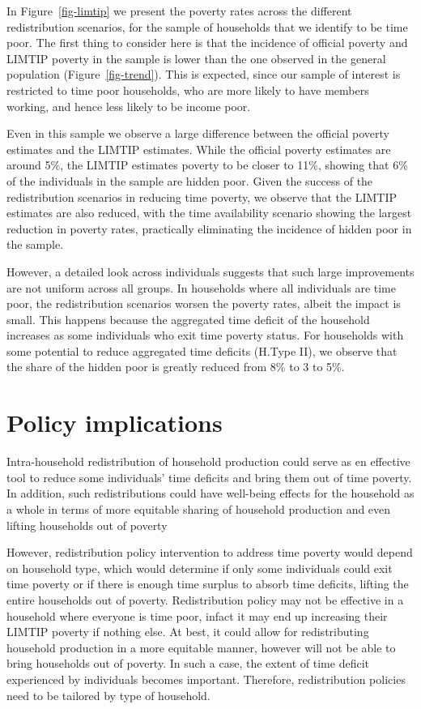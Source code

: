 \documentclass[
  11pt,
]{article}
\begin{document}
In Figure~\ref{fig-limtip} we present the poverty rates across the
different redistribution scenarios, for the sample of households that we
identify to be time poor. The first thing to consider here is that the
incidence of official poverty and LIMTIP poverty in the sample is lower
than the one observed in the general population
(Figure~\ref{fig-trend}). This is expected, since our sample of interest
is restricted to time poor households, who are more likely to have
members working, and hence less likely to be income poor.

Even in this sample we observe a large difference between the official
poverty estimates and the LIMTIP estimates. While the official poverty
estimates are around 5\%, the LIMTIP estimates poverty to be closer to
11\%, showing that 6\% of the individuals in the sample are hidden poor.
Given the success of the redistribution scenarios in reducing time
poverty, we observe that the LIMTIP estimates are also reduced, with the
time availability scenario showing the largest reduction in poverty
rates, practically eliminating the incidence of hidden poor in the
sample.

However, a detailed look across individuals suggests that such large
improvements are not uniform across all groups. In households where all
individuals are time poor, the redistribution scenarios worsen the
poverty rates, albeit the impact is small. This happens because the
aggregated time deficit of the household increases as some individuals
who exit time poverty status. For households with some potential to
reduce aggregated time deficits (H.Type II), we observe that the share
of the hidden poor is greatly reduced from 8\% to 3 to 5\%.

\section{Policy implications}\label{policy-implications}

Intra-household redistribution of household production could serve as en
effective tool to reduce some individuals' time deficits and bring them
out of time poverty. In addition, such redistributions could have
well-being effects for the household as a whole in terms of more
equitable sharing of household production and even lifting households
out of poverty

However, redistribution policy intervention to address time poverty
would depend on household type, which would determine if only some
individuals could exit time poverty or if there is enough time surplus
to absorb time deficits, lifting the entire households out of poverty.
Redistribution policy may not be effective in a household where everyone
is time poor, infact it may end up increasing their LIMTIP poverty if
nothing else. At best, it could allow for redistributing household
production in a more equitable manner, however will not be able to bring
households out of poverty. In such a case, the extent of time deficit
experienced by individuals becomes important. Therefore, redistribution
policies need to be tailored by type of household.
\end{document}
